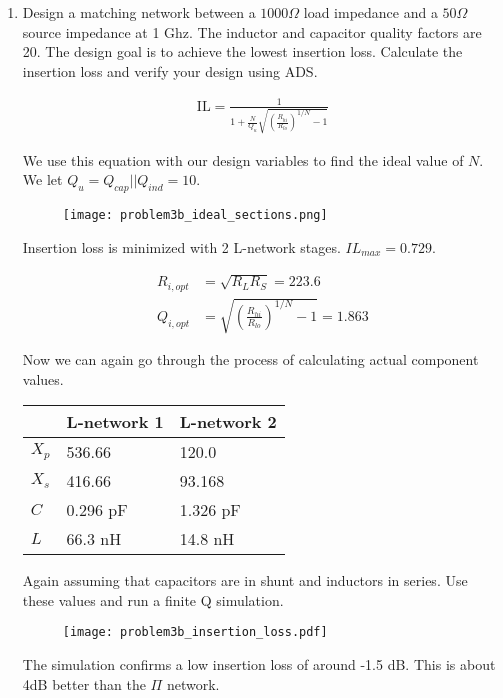 \begin{enumerate}[label=(\alph*)]
    \item {\color{blue}Design a matching network between a $1000 \Omega$ load impedance and a $50\Omega$ source impedance at 1 Ghz. The inductor and capacitor quality factors are 20. The design goal is to achieve the lowest insertion loss. Calculate the insertion loss and verify your design using ADS.}

    \begin{align*}
        \text{IL} = \frac{1}{1 + \frac{N}{Q_u} \sqrt{(\frac{R_{hi}}{R_{lo}})^{1/N} - 1}}
    \end{align*}

    We use this equation with our design variables to find the ideal value of $N$. We let $Q_u = Q_{cap} || Q_{ind} = 10$.

    \begin{figure}[H]
        \centering \texttt{[image: problem3b\_ideal\_sections.png]}
    \end{figure}

    Insertion loss is minimized with 2 L-network stages. $IL_{max} = 0.729$.

    \begin{align*}
        R_{i,opt} &= \sqrt{R_L R_S} = 223.6 \\
        Q_{i,opt} &= \sqrt{(\frac{R_{hi}}{R_{lo}})^{1/N} - 1} = 1.863
    \end{align*}

    Now we can again go through the process of calculating actual component values.
    \begin{center}
    \begin{tabular}{l | l | l |}
        & L-network 1 & L-network 2 \\ \hline
        $X_p$ & 536.66 & 120.0 \\ \hline
        $X_s$ & 416.66 & 93.168 \\ \hline
        $C$ & 0.296 pF & 1.326 pF \\ \hline
        $L$ & 66.3 nH & 14.8 nH \\ \hline
    \end{tabular}
    \end{center}

    Again assuming that capacitors are in shunt and inductors in series. Use these values and run a finite Q simulation.
    \begin{figure}[H]
        \centering \texttt{[image: problem3b\_insertion\_loss.pdf]}
    \end{figure}

    The simulation confirms a low insertion loss of around -1.5 dB. This is about 4dB better than the $\Pi$ network.
\end{enumerate}


